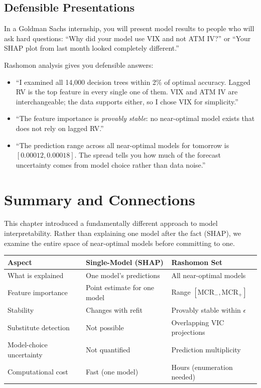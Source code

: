 \subsection{Defensible Presentations}

In a Goldman Sachs internship, you will present model results to people who
will ask hard questions: ``Why did your model use VIX and not ATM IV?'' or
``Your SHAP plot from last month looked completely different.''

Rashomon analysis gives you defensible answers:

\begin{itemize}[leftmargin=1.8em]
  \item ``I examined all 14{,}000 decision trees within 2\% of optimal
    accuracy.  Lagged RV is the top feature in every single one of them.
    VIX and ATM IV are interchangeable; the data supports either, so I
    chose VIX for simplicity.''
  \item ``The feature importance is \emph{provably stable}: no
    near-optimal model exists that does not rely on lagged RV.''
  \item ``The prediction range across all near-optimal models for tomorrow is
    $[0.00012, 0.00018]$.  The spread tells you how much of the forecast
    uncertainty comes from model choice rather than data noise.''
\end{itemize}


\section{Summary and Connections}\label{sec:rashomon:summary}

This chapter introduced a fundamentally different approach to model
interpretability.  Rather than explaining one model after the fact (SHAP), we
examine the entire space of near-optimal models before committing to one.

\begin{center}
\begin{tabular}{p{4.2cm}p{4.8cm}p{4.8cm}}
\toprule
\textbf{Aspect} & \textbf{Single-Model (SHAP)} & \textbf{Rashomon Set} \\
\midrule
What is explained & One model's predictions & All near-optimal models \\
Feature importance & Point estimate for one model & Range $[\text{MCR}_{-}, \text{MCR}_{+}]$ \\
Stability & Changes with refit & Provably stable within $\epsilon$ \\
Substitute detection & Not possible & Overlapping VIC projections \\
Model-choice uncertainty & Not quantified & Prediction multiplicity \\
Computational cost & Fast (one model) & Hours (enumeration needed) \\
\bottomrule
\end{tabular}
\end{center}


